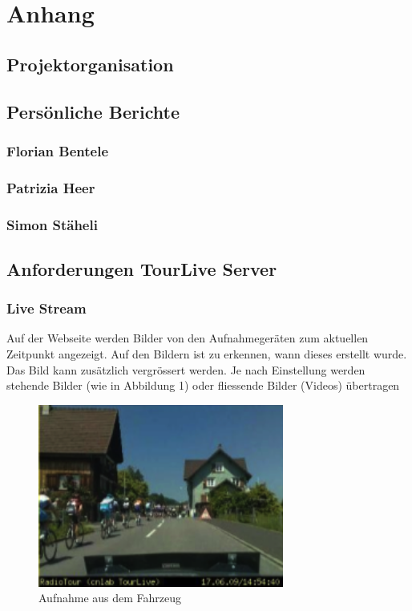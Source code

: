 \chapter{Anhang}



\section{Projektorganisation}



\section{Persönliche Berichte}

\subsection{Florian Bentele}


\subsection{Patrizia Heer}

\subsection{Simon Stäheli}

\section{Anforderungen TourLive Server}
\label{sec:tourliveusecase}
\subsection{Live Stream}
Auf der Webseite werden Bilder von den Aufnahmegeräten zum aktuellen Zeitpunkt angezeigt. Auf den Bildern ist zu erkennen, wann dieses erstellt wurde. Das Bild kann zusätzlich vergrössert werden. Je nach Einstellung werden stehende Bilder (wie in Abbildung 1) oder fliessende Bilder (Videos) übertragen
\begin{figure}[H]
	\centering
	\includegraphics[height=60mm]{images/tourliveaufnahme.png}
	\caption{Aufnahme aus dem Fahrzeug}
\end{figure}

